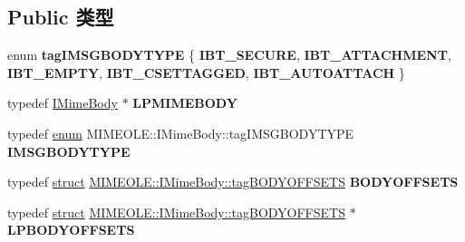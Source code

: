 \subsection*{Public 类型}
\begin{DoxyCompactItemize}
\item 
\mbox{\label{interface_m_i_m_e_o_l_e_1_1_i_mime_body_abe33467fc0b6272a6e69d8e2f8c45cd1}} 
enum {\bfseries tag\+I\+M\+S\+G\+B\+O\+D\+Y\+T\+Y\+PE} \{ \newline
{\bfseries I\+B\+T\+\_\+\+S\+E\+C\+U\+RE}, 
{\bfseries I\+B\+T\+\_\+\+A\+T\+T\+A\+C\+H\+M\+E\+NT}, 
{\bfseries I\+B\+T\+\_\+\+E\+M\+P\+TY}, 
{\bfseries I\+B\+T\+\_\+\+C\+S\+E\+T\+T\+A\+G\+G\+ED}, 
\newline
{\bfseries I\+B\+T\+\_\+\+A\+U\+T\+O\+A\+T\+T\+A\+CH}
 \}
\item 
\mbox{\label{interface_m_i_m_e_o_l_e_1_1_i_mime_body_aaebffa90c22007344d6e33dc21d8c449}} 
typedef \hyperlink{interface_m_i_m_e_o_l_e_1_1_i_mime_body}{I\+Mime\+Body} $\ast$ {\bfseries L\+P\+M\+I\+M\+E\+B\+O\+DY}
\item 
\mbox{\label{interface_m_i_m_e_o_l_e_1_1_i_mime_body_a5ba2b29ff7e303c1f53008d6cc1587da}} 
typedef \hyperlink{interfaceenum}{enum} M\+I\+M\+E\+O\+L\+E\+::\+I\+Mime\+Body\+::tag\+I\+M\+S\+G\+B\+O\+D\+Y\+T\+Y\+PE {\bfseries I\+M\+S\+G\+B\+O\+D\+Y\+T\+Y\+PE}
\item 
\mbox{\label{interface_m_i_m_e_o_l_e_1_1_i_mime_body_a08a4d2a3e889b5f4b953a33ad349aabb}} 
typedef \hyperlink{interfacestruct}{struct} \hyperlink{struct_m_i_m_e_o_l_e_1_1_i_mime_body_1_1tag_b_o_d_y_o_f_f_s_e_t_s}{M\+I\+M\+E\+O\+L\+E\+::\+I\+Mime\+Body\+::tag\+B\+O\+D\+Y\+O\+F\+F\+S\+E\+TS} {\bfseries B\+O\+D\+Y\+O\+F\+F\+S\+E\+TS}
\item 
\mbox{\label{interface_m_i_m_e_o_l_e_1_1_i_mime_body_a3f73cd77a300cf8860e39ab87112e958}} 
typedef \hyperlink{interfacestruct}{struct} \hyperlink{struct_m_i_m_e_o_l_e_1_1_i_mime_body_1_1tag_b_o_d_y_o_f_f_s_e_t_s}{M\+I\+M\+E\+O\+L\+E\+::\+I\+Mime\+Body\+::tag\+B\+O\+D\+Y\+O\+F\+F\+S\+E\+TS} $\ast$ {\bfseries L\+P\+B\+O\+D\+Y\+O\+F\+F\+S\+E\+TS}
\item 

\end{DoxyCompactItemize}
